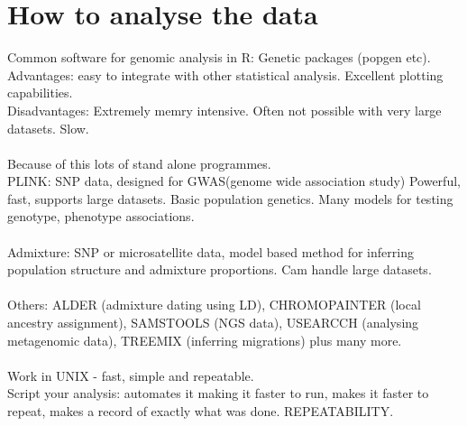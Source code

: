 \documentclass[11pt]{article}
\begin{document}
\section{How to analyse the data}
Common software for genomic analysis in R: Genetic packages (popgen etc).\\
Advantages: easy to integrate with other statistical analysis. Excellent plotting capabilities.\\
Disadvantages: Extremely memry intensive. Often not possible with very large datasets. Slow.\\
\\
Because of this lots of stand alone programmes.
\\
PLINK: SNP data, designed for GWAS(genome wide association study) Powerful, fast, supports large datasets. Basic population genetics. Many models for testing genotype, phenotype associations.
\\
\\
Admixture: SNP or microsatellite data, model based method for inferring population structure and admixture proportions. Cam handle large datasets. 
\\
\\
Others: ALDER (admixture dating using LD), CHROMOPAINTER (local ancestry assignment), SAMSTOOLS (NGS data), USEARCCH (analysing metagenomic data), TREEMIX (inferring migrations) plus many more.
\\
\\
Work in UNIX - fast, simple and repeatable. \\
Script your analysis: automates it making it faster to run, makes it faster to repeat, makes a record of exactly what was done. REPEATABILITY.
\end{document}
